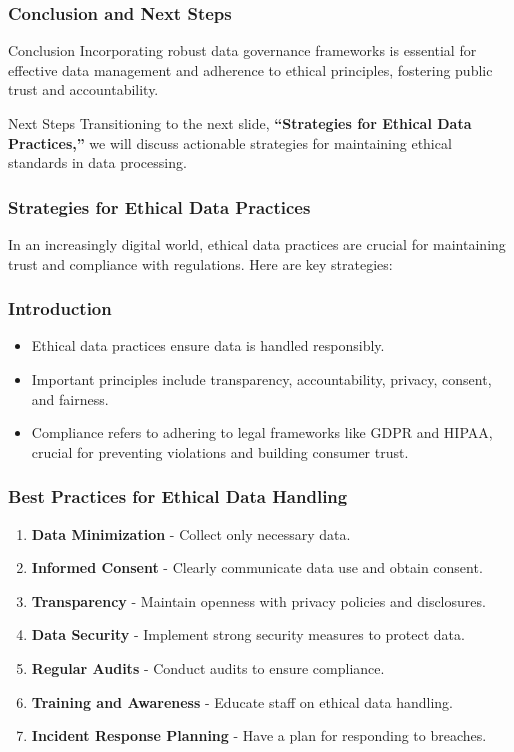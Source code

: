\documentclass[aspectratio=169]{beamer}
\begin{document}
\begin{frame}[fragile]
    \frametitle{Conclusion and Next Steps}
    \begin{block}{Conclusion}
        Incorporating robust data governance frameworks is essential for effective data management and adherence to ethical principles, fostering public trust and accountability.
    \end{block}

    \begin{block}{Next Steps}
        Transitioning to the next slide, \textbf{“Strategies for Ethical Data Practices,”} we will discuss actionable strategies for maintaining ethical standards in data processing.
    \end{block}
\end{frame}

\begin{frame}
    \frametitle{Strategies for Ethical Data Practices}
    In an increasingly digital world, ethical data practices are crucial for maintaining trust and compliance with regulations. Here are key strategies:
\end{frame}

\begin{frame}
    \frametitle{Introduction}
    \begin{itemize}
        \item Ethical data practices ensure data is handled responsibly.
        \item Important principles include transparency, accountability, privacy, consent, and fairness.
        \item Compliance refers to adhering to legal frameworks like GDPR and HIPAA, crucial for preventing violations and building consumer trust.
    \end{itemize}
\end{frame}

\begin{frame}
    \frametitle{Best Practices for Ethical Data Handling}
    \begin{enumerate}
        \item \textbf{Data Minimization} - Collect only necessary data.
        \item \textbf{Informed Consent} - Clearly communicate data use and obtain consent.
        \item \textbf{Transparency} - Maintain openness with privacy policies and disclosures.
        \item \textbf{Data Security} - Implement strong security measures to protect data.
        \item \textbf{Regular Audits} - Conduct audits to ensure compliance.
        \item \textbf{Training and Awareness} - Educate staff on ethical data handling.
        \item \textbf{Incident Response Planning} - Have a plan for responding to breaches.
    \end{enumerate}
\end{frame}
\end{document}
